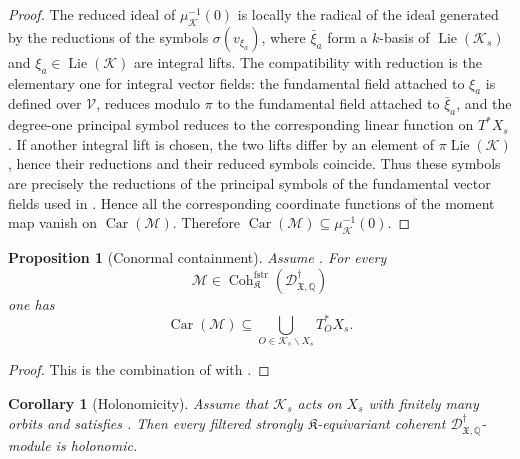 \documentclass[11pt]{amsart}
\theoremstyle{plain}
\newtheorem{proposition}{Proposition}[section]
\newtheorem{corollary}{Corollary}[section]
\theoremstyle{definition}
\theoremstyle{remark}
\newcommand{\Coh}{\operatorname{Coh}}
\newcommand{\Car}{\operatorname{Car}}
\newcommand{\Lie}{\operatorname{Lie}}
\newcommand{\fstr}{\mathrm{fstr}}
\begin{document}
\begin{proof}
The reduced ideal of \(\mu_{\mathcal K}^{-1}(0)\) is locally the radical of
the ideal generated by the reductions of the symbols \(\sigma(v_{\xi_a})\),
where \(\bar\xi_a\) form a \(k\)-basis of \(\Lie(\mathcal K_s)\) and
\(\xi_a\in\Lie(\mathcal K)\) are integral lifts.  The compatibility with
reduction is the elementary one for integral vector fields: the fundamental
field attached to \(\xi_a\) is defined over \(\mathcal V\), reduces modulo
\(\pi\) to the fundamental field attached to \(\bar\xi_a\), and the degree-one
principal symbol reduces to the corresponding linear function on
\(T^*X_s\).  If another integral lift is chosen, the two lifts differ by an
element of \(\pi\Lie(\mathcal K)\), hence their reductions and their reduced
symbols coincide.  Thus these symbols are precisely the reductions of the
principal symbols of the fundamental vector fields used in
. Hence all the corresponding coordinate
functions of the moment map vanish on \(\Car(\mathcal M)\). Therefore
\(\Car(\mathcal M)\subseteq\mu_{\mathcal K}^{-1}(0)\).
\end{proof}

\begin{proposition}[Conormal containment]
\label{prop:conormal-containment}
Assume .  For every
\[
  \mathcal M\in
  \Coh^{\fstr}_{\mathfrak K}
  (\mathscr D^\dagger_{\mathfrak X,\mathbb Q})
\]
one has
\[
  \Car(\mathcal M)
  \subseteq
  \bigcup_{O\in \mathcal K_s\backslash X_s}T^*_O X_s.
\]
\end{proposition}

\begin{proof}
This is the combination of  with
.
\end{proof}

\begin{corollary}[Holonomicity]
\label{cor:strong-equivariant-holonomic}
Assume that \(\mathcal K_s\) acts on \(X_s\) with finitely many orbits and
satisfies . Then every filtered strongly \(\mathfrak K\)-equivariant coherent
\(\mathscr D^\dagger_{\mathfrak X,\mathbb Q}\)-module is holonomic.
\end{corollary}
\end{document}
